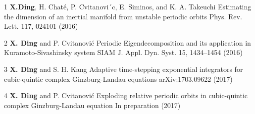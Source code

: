 



\begin{cvpub}

  \cvpubentry
  {1}
  {\textbf{X.Ding},  H. Chaté, P. Cvitanovi´c, E. Siminos, and K. A. Takeuchi}
  {Estimating the dimension of an inertial manifold from unstable periodic orbits}
  {Phys. Rev. Lett. 117, 024101 (2016)}

  \cvpubentry
  {2}
  {\textbf{X. Ding} and P. Cvitanovi\'c}
  {Periodic Eigendecomposition and its application in Kuramoto-Sivashinsky system}
  {SIAM J. Appl. Dyn. Syst. 15, 1434–1454 (2016)}

  \cvpubentry
  {3}
  {\textbf{X. Ding} and S. H. Kang}
  {Adaptive time-stepping exponential integrators for cubic-quintic complex Ginzburg-Landau equations}
  {arXiv:1703.09622 (2017)}

  \cvpubentry
  {4}
  {\textbf{X. Ding} and P. Cvitanovi\'c}
  {Exploding relative periodic orbits in cubic-quintic complex Ginzburg-Landau equation}
  {In preparation (2017)}


\end{cvpub}
